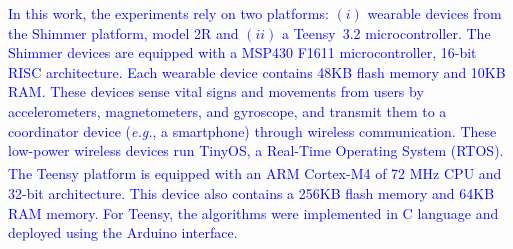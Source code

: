 \documentclass[journal]{IEEEtran}
\newcommand{\rever}{\textcolor{blue}}
\begin{document}

\rever{In this work, the experiments rely on two platforms: %
$(i)$ wearable devices from the Shimmer platform, model 2R %
and $(ii)$ a Teensy\texttrademark~3.2 microcontroller. The Shimmer devices are equipped with a MSP430 F1611 microcontroller, 16-bit RISC architecture. Each wearable device contains 48KB flash memory and 10KB RAM. These devices sense vital signs and movements from users by accelerometers, magnetometers, and gyroscope, and transmit them to a coordinator device ({\em e.g.}, a smartphone) through wireless communication. These low-power wireless devices run TinyOS, a Real-Time Operating System (RTOS). The Teensy platform is equipped with an ARM\textsuperscript{\textregistered} Cortex\textsuperscript{\textregistered}-M4 of 72 MHz CPU and 32-bit architecture. This device also contains a 256KB flash memory and 64KB RAM memory. For Teensy, the algorithms were implemented in C language and deployed using the Arduino interface.} %

\end{document}

